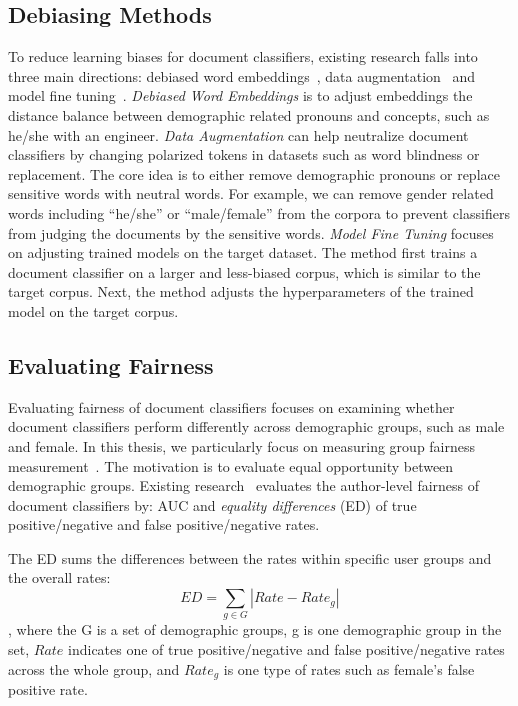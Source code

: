 \subsection{Debiasing Methods}

To reduce learning biases for document classifiers, existing research falls into three main directions: debiased word embeddings~\cite{zhao2017men}, data augmentation~\cite{dixon2018measuring, zhao2019gender} and model fine tuning~\cite{park2018reducing}.
\textit{Debiased Word Embeddings} is to adjust embeddings the distance balance between demographic related pronouns and concepts, such as he/she with an engineer.
\textit{Data Augmentation} can help neutralize document classifiers by changing polarized tokens in datasets such as word blindness or replacement. 
The core idea is to either remove demographic pronouns or replace sensitive words with neutral words.
For example, we can remove gender related words including  ``he/she'' or ``male/female'' from the corpora to prevent classifiers from judging the documents by the sensitive words.
\textit{Model Fine Tuning} focuses on adjusting trained models on the target dataset. The method first trains a document classifier on a larger and less-biased corpus, which is similar to the target corpus. 
Next, the method adjusts the hyperparameters of the trained model on the target corpus.


\subsection{Evaluating Fairness}

Evaluating fairness of document classifiers focuses on examining whether document classifiers perform differently across demographic groups, such as male and female.
In this thesis, we particularly focus on measuring group fairness measurement~\cite{hardt2016equality}. 
The motivation is to evaluate equal opportunity between demographic groups.
Existing research~\cite{dixon2018measuring, garg2019counterfactual, park2018reducing} evaluates the author-level fairness of document classifiers by: AUC and \textit{equality differences} (ED) of true positive/negative and false positive/negative rates.

The ED sums the differences between the rates within specific user groups and the overall rates:
$$ED = \sum_{g \in G}|Rate - Rate_g|$$
, where the G is a set of demographic groups, g is one demographic group in the set, $Rate$ indicates one of true positive/negative and false positive/negative rates across the whole group, and $Rate_g$ is one type of rates such as female's false positive rate.
